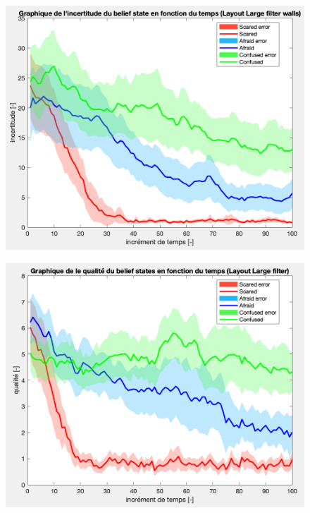 \documentclass{article}
\begin{document}
\begin{enumerate}[label=\alph*.,leftmargin=*]
\begin{figure}[h!]
        \centering
        \includegraphics[scale=0.75]{iw.png}
    \end{figure}
    \newpage
    \begin{figure}[h!]
        \centering
        \includegraphics[scale=0.75]{q.png}
    \end{figure}
    \begin{figure}[h!]
        \centering

\end{figure}
\end{enumerate}
\end{document}
